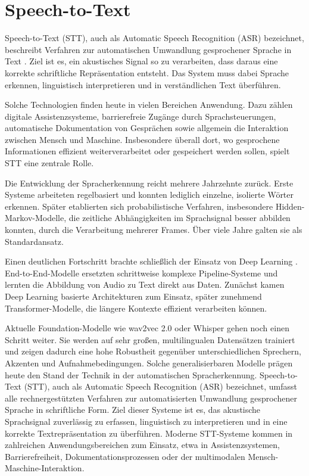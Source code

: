 \newpage
\section{Speech-to-Text}
Speech-to-Text (STT), auch als Automatic Speech Recognition (ASR) bezeichnet, beschreibt Verfahren zur automatischen Umwandlung gesprochener Sprache in Text \cite{Prabhavalkar2023}. Ziel ist es, ein akustisches Signal so zu verarbeiten, dass daraus eine korrekte schriftliche Repräsentation entsteht. Das System muss dabei Sprache erkennen, linguistisch interpretieren und in verständlichen Text überführen.

Solche Technologien finden heute in vielen Bereichen Anwendung. Dazu zählen digitale Assistenzsysteme, barrierefreie Zugänge durch Sprachsteuerungen, automatische Dokumentation von Gesprächen sowie allgemein die Interaktion zwischen Mensch und Maschine. Insbesondere überall dort, wo gesprochene Informationen effizient weiterverarbeitet oder gespeichert werden sollen, spielt STT eine zentrale Rolle.

Die Entwicklung der Spracherkennung reicht mehrere Jahrzehnte zurück. Erste Systeme arbeiteten regelbasiert und konnten lediglich einzelne, isolierte Wörter erkennen. Später etablierten sich probabilistische Verfahren, insbesondere Hidden-Markov-Modelle, die zeitliche Abhängigkeiten im Sprachsignal besser abbilden konnten, durch die Verarbeitung mehrerer Frames. Über viele Jahre galten sie als Standardansatz.

Einen deutlichen Fortschritt brachte schließlich der Einsatz von Deep Learning \cite{Hinton2012}. End-to-End-Modelle ersetzten schrittweise komplexe Pipeline-Systeme und lernten die Abbildung von Audio zu Text direkt aus Daten. Zunächst kamen Deep Learning basierte Architekturen zum Einsatz, später zunehmend Transformer-Modelle, die längere Kontexte effizient verarbeiten können.

Aktuelle Foundation-Modelle wie wav2vec 2.0 \cite{Baevski2020} oder Whisper \cite{Radford2022} gehen noch einen Schritt weiter. Sie werden auf sehr großen, multilingualen Datensätzen trainiert und zeigen dadurch eine hohe Robustheit gegenüber unterschiedlichen Sprechern, Akzenten und Aufnahmebedingungen. Solche generalisierbaren Modelle prägen heute den Stand der Technik in der automatischen Spracherkennung.
Speech-to-Text (STT), auch als Automatic Speech Recognition (ASR) bezeichnet, umfasst alle rechnergestützten Verfahren zur automatisierten Umwandlung gesprochener Sprache in schriftliche Form. Ziel dieser Systeme ist es, das akustische Sprachsignal zuverlässig zu erfassen, linguistisch zu interpretieren und in eine korrekte Textrepräsentation zu überführen. Moderne STT-Systeme kommen in zahlreichen Anwendungsbereichen zum Einsatz, etwa in Assistenzsystemen, Barrierefreiheit, Dokumentationsprozessen oder der multimodalen Mensch-Maschine-Interaktion.


